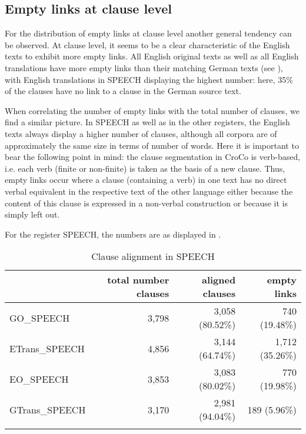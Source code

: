 \documentclass[output=paper]{LSP/langsci}
\begin{document}
\subsection{Empty links at clause level}\label{sec:culo:4.2}

For the distribution of empty links at clause level another general tendency can be observed. At clause level, it seems to be a clear characteristic of the English texts to exhibit more empty links. All English original texts as well as all English translations have more empty links than their matching German texts (see ), with English translations in SPEECH displaying the highest number: here, 35\% of the clauses have no link to a clause in the German source text. 

When correlating the number of empty links with the total number of clauses, we find a similar picture. In SPEECH as well as in the other registers, the English texts always display a higher number of clauses, although all corpora are of approximately the same size in terms of number of words. Here it is important to bear the following point in mind: the clause segmentation in CroCo is verb-based, i.e. each verb (finite or non-finite) is taken as the basis of a new clause. Thus, empty links occur where a clause (containing a verb) in one text has no direct verbal equivalent in the respective text of the other language either because the content of this clause is expressed in a non-verbal construction or because it is simply left out.

For the register SPEECH, the numbers are as displayed in .

\begin{table}
\begin{tabular}{lrrr} 
\lsptoprule
{} & total number clauses & aligned clauses & empty links\\
\midrule
GO\_SPEECH & 3,798 & 3,058 (80.52\%) & 740 (19.48\%)\\
ETrans\_SPEECH & 4,856 & 3,144 (64.74\%) & 1,712 (35.26\%)\\
EO\_SPEECH & 3,853 & 3,083 (80.02\%) & 770 (19.98\%)\\
GTrans\_SPEECH & 3,170 & 2,981 (94.04\%) & 189 (5.96\%)\\
\lspbottomrule
\end{tabular}
\caption{Clause alignment in SPEECH}
\label{tab:culo:2}
\end{table}
\end{document}
